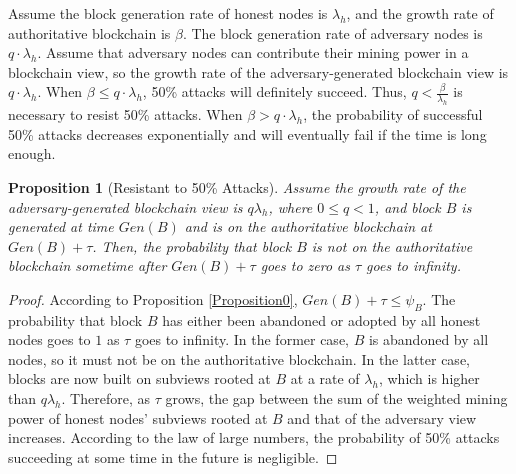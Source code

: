 \documentclass[10pt,journal,compsoc]{IEEEtran}
\newtheorem{proposition}{Proposition}
\begin{document}
	Assume the block generation rate of honest nodes is $\lambda_h$, and the growth rate of authoritative blockchain is $\beta$. The block generation rate of adversary nodes is $q \cdot \lambda_h$. Assume that adversary nodes can contribute their mining power in a blockchain view, so the growth rate of the adversary-generated blockchain view is $q \cdot \lambda_h$. When $\beta \leq q \cdot \lambda_h$,  50\% attacks will definitely succeed. Thus, $q < \frac{\beta}{\lambda_h}$ is necessary to resist 50\% attacks.
	When $\beta > q \cdot \lambda_h$, the probability of successful 50\% attacks decreases exponentially and will eventually fail if the time is long enough. 
	
	\begin{proposition}[Resistant to 50\% Attacks] \label{Proposition1}
		Assume the growth rate of the adversary-generated blockchain view is $q \lambda_h$, where $0\leq q <1$, and block $B$ is generated at time $Gen(B)$ and is on the authoritative blockchain at $Gen(B) +\tau$. Then, the probability that block $B$ is not on the authoritative blockchain sometime after $Gen(B) +\tau$ goes to zero as $\tau$ goes to infinity.
		
	\end{proposition}
	\begin{proof}
		According to Proposition \ref{Proposition0}, $Gen(B) +\tau \leq \psi_B$.  The probability that block $B$ has either been abandoned or adopted by all honest nodes goes to $1$ as $\tau$ goes to infinity. 
		In the former case, $B$ is abandoned by all nodes, so it must not be on the authoritative blockchain. 
		In the latter case, blocks are now built on subviews rooted at $B$ at a rate of $\lambda_h$, which is higher than $q\lambda_h$.
		Therefore, as $\tau $ grows, the gap between the sum of the weighted mining power of honest nodes’ subviews rooted at $B$ and that of the adversary view increases. According to the law of large numbers, the probability of 50\% attacks succeeding at some time in the future is negligible.
	\end{proof}

 
 




\end{document}

